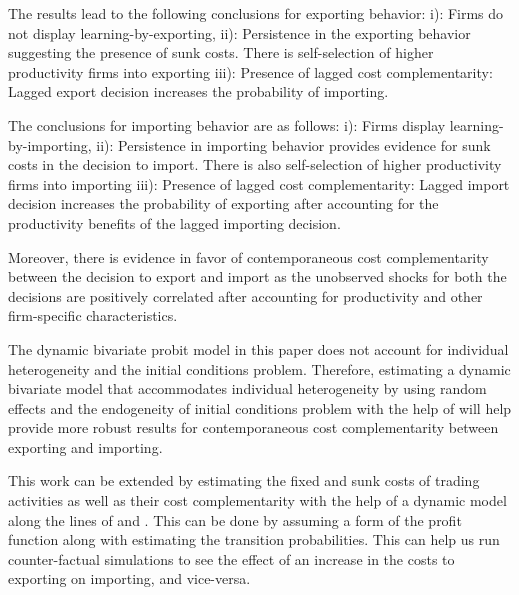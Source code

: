 \documentclass[12pt]{article}
\begin{document}
The results lead to the following conclusions for exporting behavior:
i): Firms do not display learning-by-exporting,
ii): Persistence in the exporting behavior suggesting the presence of
sunk costs.  There is 
  self-selection of higher productivity firms into
   exporting  
iii):  Presence of lagged cost complementarity: Lagged export
decision increases the probability of importing.

The conclusions for importing behavior are as follows:
i): Firms display learning-by-importing,
ii): Persistence in importing behavior provides evidence for
sunk costs in the decision to import. There is also self-selection of higher productivity firms into
   importing
iii):  Presence of lagged cost complementarity: Lagged import decision
increases the probability of exporting after accounting for the
productivity benefits of the lagged importing decision. 

Moreover, there is evidence in favor of contemporaneous cost complementarity between the
decision to export and import as  the unobserved shocks for both the
decisions are positively
correlated after accounting for productivity and other firm-specific
characteristics. 


The dynamic bivariate probit model in this paper does not account for
individual heterogeneity and the initial conditions
problem. Therefore, estimating a dynamic bivariate model that
accommodates individual heterogeneity by using random effects and the
endogeneity of initial conditions problem with the help of
\textcite{wooldridge2005simple} will help provide more robust
results for contemporaneous cost complementarity between exporting and
importing. 

This work can be extended by estimating the fixed and sunk
costs of trading activities as well as their cost
complementarity with the help of a dynamic model along the lines of
\textcite{kasahara2013productivity} and \textcite{aw2011}. This can be
done by assuming a form of the profit function along with estimating
the transition probabilities. This can
help us run  counter-factual 
simulations to see the effect of an increase in the
costs to exporting on importing, and vice-versa.  
\end{document}
